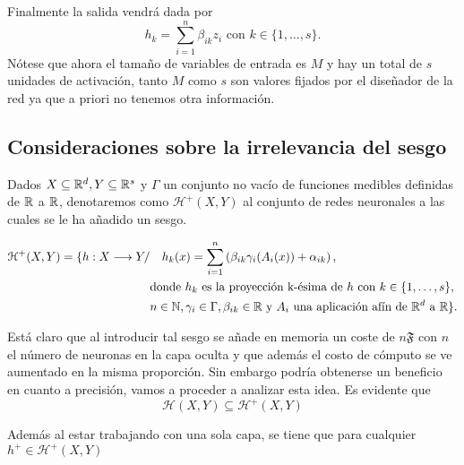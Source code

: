  Finalmente la salida vendrá dada por
 \begin{equation}
    h_k = \sum_{i=1}^n \beta_{i k} z_i 
    \text{ con } k \in \{1, \ldots, s \}.
\end{equation}
Nótese que ahora el tamaño de variables de entrada es $M$
y hay un total de $s$ unidades de activación, tanto $M$ como $s$ son
valores fijados por el diseñador de la red ya que a priori no tenemos otra información. 

\subsection{Consideraciones sobre la irrelevancia del sesgo}
\label{consideration-irrelevancia-sesgo}
\begin{aportacionOriginal}

 Dados $X \subseteq \mathbb{R}^d, Y \subseteq \mathbb{R}^s$ y  $\Gamma$ un conjunto no vacío de funciones medibles definidas de $\mathbb{R}$ a $\mathbb{R}$, denotaremos como $\mathcal{H}^+(X,Y)$ al conjunto de redes neuronales a las cuales se le ha añadido un sesgo. 

\begin{align}
    \mathcal{H}^+(X,Y) 
    =
    \{
        h : X \longrightarrow Y 
        /& \quad 
        h_k(x) = 
        \sum_{i=1}^{n} \left( \beta_{i k} \gamma_{i}( A_{i}(x)) + \alpha_{i k} \right), \\
        & \text{donde  $h_k$  es la proyección k-ésima de $h$ con 
        $k \in \{1, \ldots, s\}$}, \\
        & n \in \mathbb{N},\gamma_{i} \in \Gamma , \beta_{i k} \in \mathbb{R}
         \text{ y }A_{i} \text{ una aplicación afín de $\mathbb{R}^d$ a $\mathbb{R}$}           
    \}.
\end{align}


Está claro que al introducir tal sesgo se añade en memoria 
un coste de $n \mathfrak{F}$ con $n$ el número de neuronas en la capa oculta y que además el costo de cómputo se ve aumentado en la misma proporción. 
Sin embargo podría obtenerse un beneficio en cuanto a precisión, 
vamos a proceder  a analizar esta idea. 
Es evidente que 
\begin{equation} \label{eq:conjuntos-redes-neuronales-con-sesgo-contiene-elemental}
    \mathcal{H}(X,Y) \subseteq \mathcal{H}^+(X,Y)
\end{equation}

Además al estar trabajando con una sola capa, se tiene que para cualquier 
$h^+ \in \mathcal{H}^+(X,Y)$


\end{aportacionOriginal}
